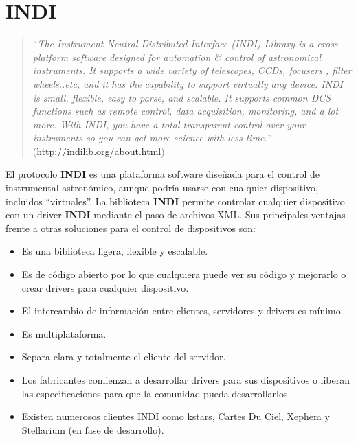 \newpage
\section{INDI}

\begin{quote}``\textit{The Instrument Neutral Distributed Interface (INDI) Library is a cross-platform software designed for automation & control of astronomical instruments. It supports a wide variety of telescopes, CCDs, focusers , filter wheels..etc, and it has the capability to support virtually any device. INDI is small, flexible, easy to parse, and scalable. It supports common DCS functions such as remote control, data acquisition, monitoring, and a lot more. With INDI, you have a total transparent control over your instruments so you can get more science with less time.}''
\newline(\href{http://indilib.org/about.html}{http://indilib.org/about.html})
\end{quote}

\bigskip

El protocolo \textbf{INDI} es una plataforma software diseñada para el control de instrumental astronómico, aunque podría usarse con cualquier dispositivo, incluidos ``virtuales''. La biblioteca \textbf{INDI} permite controlar cualquier dispositivo con un driver \textbf{INDI} mediante el paso de archivos XML. Sus principales ventajas frente a otras soluciones para el control de dispositivos son:


\begin{itemize}
  \item Es una biblioteca ligera, flexible y escalable.
  \item Es de código abierto por lo que cualquiera puede ver su código y mejorarlo o crear drivers para cualquier dispositivo.
  \item El intercambio de información entre clientes, servidores y drivers es mínimo.
  \item Es multiplataforma.
  \item Separa clara y totalmente el cliente del servidor.
  \item Los fabricantes comienzan a desarrollar drivers para sus dispositivos o liberan las especificaciones para que la comunidad pueda desarrollarlos.
  \item Existen numerosos clientes INDI como \href{https://edu.kde.org/kstars/}{kstars}, Cartes Du Ciel, Xephem y Stellarium (en fase de desarrollo).

\end{itemize}

